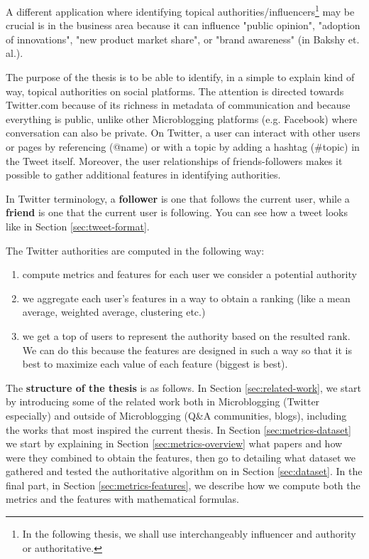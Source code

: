 
A different application where identifying topical authorities/influencers\footnote{\label{noteinfluencer}In the following thesis, we shall use interchangeably influencer and authority or authoritative.} may be crucial is in the business area because it can influence "public opinion"\cite{katz}, "adoption of innovations"\cite{rogers}, "new product market share"\cite{bass}, or "brand awareness"\cite{keller} (in Bakshy et. al.\cite{bakshy}).

The purpose of the thesis is to be able to identify, in a simple to explain kind of way, topical authorities on social platforms. The attention is directed towards Twitter.com because of its
richness in metadata of communication and because everything is public, unlike other Microblogging platforms (e.g. Facebook) where conversation can also be private. On Twitter, a user can interact with other users or pages by referencing (@name) or with a topic by adding a hashtag (\#topic) in the Tweet itself. Moreover, the user relationships of friends-followers makes it possible to gather additional features in identifying authorities.

In Twitter terminology, a \textbf{follower} is one that follows the current user, while a \textbf{friend} is one that the current user is following. You can see how a tweet looks like in Section 
\ref{sec:tweet-format}.

The Twitter authorities are computed in the following way:
\begin{enumerate}
	\item compute metrics and features for each user we consider a potential authority
    \item we aggregate each user's features in a way to obtain a ranking (like a mean average, weighted average, clustering etc.)
    \item we get a top of users to represent the authority based on the resulted rank. We can do this because the features are designed in such a way so that it is best to maximize each value of each feature (biggest is best).
\end{enumerate}

The \textbf{structure of the thesis} is as follows. In Section \ref{sec:related-work}, we start by introducing some of the related work both in Microblogging (Twitter especially) and outside of Microblogging (Q\&A communities, blogs), including the works that most inspired the current thesis. In Section \ref{sec:metrics-dataset} we start by explaining in Section \ref{sec:metrics-overview} what papers and how were they combined to obtain the features, then go to detailing what dataset we gathered and tested the authoritative algorithm on in Section \ref{sec:dataset}. In the final part, in Section \ref{sec:metrics-features}, we describe how we compute both the metrics and the features with mathematical formulas.

